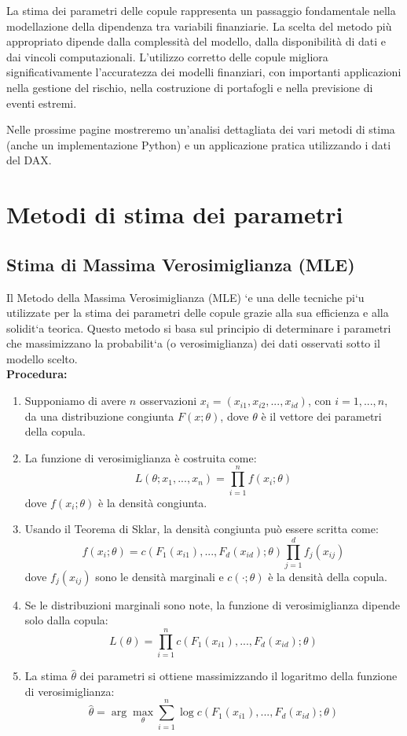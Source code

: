 \documentclass[%
	corpo=11pt,
    twoside,
    stile=classica,
    oldstyle,
    tipotesi=custom,
    greek,
    evenboxes,
]{toptesi}
\begin{document}
La stima dei parametri delle copule rappresenta un passaggio fondamentale nella modellazione della dipendenza tra variabili finanziarie. La scelta del metodo più appropriato dipende dalla complessità del modello, dalla disponibilità di dati e dai vincoli computazionali. L’utilizzo corretto delle copule migliora significativamente l’accuratezza dei modelli finanziari, con importanti applicazioni nella gestione del rischio, nella costruzione di portafogli e nella previsione di eventi estremi.

Nelle prossime pagine mostreremo un’analisi dettagliata dei vari metodi di
stima (anche un implementazione Python) e un applicazione pratica utilizzando i dati del DAX.

\section{Metodi di stima dei parametri}

\subsection{Stima di Massima Verosimiglianza (MLE)}

Il Metodo della Massima Verosimiglianza (MLE) `e una delle tecniche
pi`u utilizzate per la stima dei parametri delle copule grazie alla sua efficienza e alla solidit`a teorica. Questo metodo si basa sul principio di determinare i parametri che massimizzano la probabilit`a (o verosimiglianza)
dei dati osservati sotto il modello scelto.\\

\textbf{Procedura:}
\begin{enumerate}
	\item Supponiamo di avere \( n \) osservazioni \( x_i = (x_{i1}, x_{i2}, ..., x_{id}) \), con \( i = 1, ..., n \), da una distribuzione congiunta \( F(x; \theta) \), dove \( \theta \) è il vettore dei parametri della copula.
	\item La funzione di verosimiglianza è costruita come:
	\[
	L(\theta; x_1, ..., x_n) = \prod_{i=1}^{n} f(x_i; \theta)
	\]
	dove \( f(x_i; \theta) \) è la densità congiunta.
	\item Usando il Teorema di Sklar, la densità congiunta può essere scritta come:
	\[
	f(x_i; \theta) = c(F_1(x_{i1}), ..., F_d(x_{id}); \theta) \prod_{j=1}^{d} f_j(x_{ij})
	\]
	dove \( f_j(x_{ij}) \) sono le densità marginali e \( c(\cdot; \theta) \) è la densità della copula.
	\item Se le distribuzioni marginali sono note, la funzione di verosimiglianza dipende solo dalla copula:
	\[
	L(\theta) = \prod_{i=1}^{n} c(F_1(x_{i1}), ..., F_d(x_{id}); \theta)
	\]
	\item La stima \( \hat{\theta} \) dei parametri si ottiene massimizzando il logaritmo della funzione di verosimiglianza:
	\[
	\hat{\theta} = \arg \max_{\theta} \sum_{i=1}^{n} \log c(F_1(x_{i1}), ..., F_d(x_{id}); \theta)
	\]
\end{enumerate}
\end{document}
